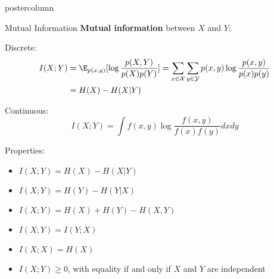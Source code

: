 \documentclass{beamer}
\begin{document}
\begin{frame}[fragile]{}
\begin{columns}
\begin{column}{.31\textwidth}
\begin{beamercolorbox}[center]{postercolumn}
\begin{minipage}{.98\textwidth}
{  \begin{myblock}{Mutual Information}
							\textbf{Mutual information} between $X$ and $Y:$
							
              Discrete:
								\begin{equation*}
									\begin{aligned}
										I(X ; Y) &= \E_{p(x, y)} [ \log \frac{p(X, Y)}{p(X) p(Y)} ] = \sum_{x \in \Xspace} \sum_{y \in \Yspace} p(x, y) \log \frac{p(x, y)}{p(x) p(y)} \\
										&= H(X)-H(X | Y)
									\end{aligned}
								\end{equation*}

              Continuous:
								$$I(X ; Y) = \int f(x,y) \log \frac{f(x,y)}{f(x)f(y)} dx dy$$


              Properties:
								\begin{itemize}[$\bullet$]
									\setlength{\itemindent}{+.3in}
										\item $ I(X ; Y) = H(X) - H(X | Y) $
											\item $I(X ; Y) = H(Y) - H(Y | X) $
											\item $I(X ; Y) = H(X) + H(Y) - H(X, Y)$
											\item $I(X ; Y) = I(Y ; X) $
											\item $I(X ; X) = H(X)$
											\item $ I(X;Y) \geq 0$, with equality if and only if $X$ and $Y$ are independent
								\end{itemize}
								
							\end{myblock}
  }
  
  \end{minipage}
  \end{beamercolorbox}
  \end{column}
  
  
  
\end{columns}
\end{frame}
\end{document}
